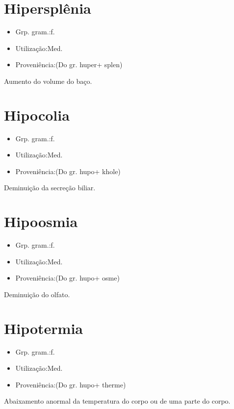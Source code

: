 \documentclass{article}
\begin{document}
\section{Hipersplênia}
\begin{itemize}
\item {Grp. gram.:f.}
\end{itemize}
\begin{itemize}
\item {Utilização:Med.}
\end{itemize}
\begin{itemize}
\item {Proveniência:(Do gr. \textunderscore huper\textunderscore  + \textunderscore splen\textunderscore )}
\end{itemize}
Aumento do volume do baço.
\section{Hipocolia}
\begin{itemize}
\item {Grp. gram.:f.}
\end{itemize}
\begin{itemize}
\item {Utilização:Med.}
\end{itemize}
\begin{itemize}
\item {Proveniência:(Do gr. \textunderscore hupo\textunderscore  + \textunderscore khole\textunderscore )}
\end{itemize}
Deminuição da secreção biliar.
\section{Hipoosmia}
\begin{itemize}
\item {Grp. gram.:f.}
\end{itemize}
\begin{itemize}
\item {Utilização:Med.}
\end{itemize}
\begin{itemize}
\item {Proveniência:(Do gr. \textunderscore hupo\textunderscore  + \textunderscore osme\textunderscore )}
\end{itemize}
Deminuição do olfato.
\section{Hipotermia}
\begin{itemize}
\item {Grp. gram.:f.}
\end{itemize}
\begin{itemize}
\item {Utilização:Med.}
\end{itemize}
\begin{itemize}
\item {Proveniência:(Do gr. \textunderscore hupo\textunderscore  + \textunderscore therme\textunderscore )}
\end{itemize}
Abaixamento anormal da temperatura do corpo ou de uma parte do corpo.
\end{document}
